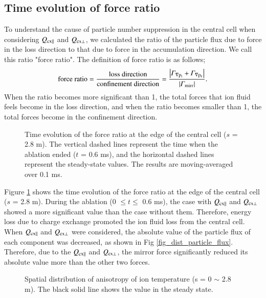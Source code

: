 \documentclass{jasse}%
\begin{document}
\subsection{Time evolution of force ratio}
To understand the cause of particle number suppression in the central cell when considering $Q_{\rm{cx\parallel}}$ and $Q_{\rm{cx\bot}}$, we calculated the ratio of the particle flux due to force in the loss direction to that due to force in the accumulation direction. We call this ratio "force ratio". The definition of force ratio is as follows; 
\begin{equation}
    \rm{force~ratio} = \frac{\rm{loss~direction}}{\rm{confinement~direction}}  = \frac{\left\lvert \varGamma _{\rm{\nabla p_{i}}} + \varGamma _{\rm{\nabla p_{e}}}\right\rvert}{\left\lvert \varGamma _{\rm{mirr}}\right\rvert}.
\end{equation}
When the ratio becomes more significant than 1, the total forces that ion fluid feels become in the loss direction, and when the ratio becomes smaller than 1, the total forces become in the confinement direction.

\begin{figure}[t]
    \centering
    
    \caption{Time evolution of the force ratio at the edge of the central cell ($s$ = 2.8 m). The vertical dashed lines represent the time when the ablation ended ($t$ = 0.6 ms), and the horizontal dashed lines represent the steady-state values. The results are moving-averaged over 0.1 ms.} \label{fig_time_evol_force_ratio}
\end{figure}

Figure \ref{fig_time_evol_force_ratio} shows the time evolution of the force ratio at the edge of the central cell ($s$ = 2.8 m). During the ablation (0 $\leq t \leq$ 0.6 ms), the case with $Q_{\rm{cx}\parallel}$ and $Q_{\rm{cx}\bot}$ showed a more significant value than the case without them. Therefore, energy loss due to charge exchange promoted the ion fluid loss from the central cell. When $Q_{\rm{cx}\parallel}$ and $Q_{\rm{cx}\bot}$ were considered, the absolute value of the particle flux of each component was decreased, as shown in Fig \ref{fig_dist_particle_flux}. Therefore, due to the $Q_{\rm{cx}\parallel}$ and $Q_{\rm{cx}\bot}$, the mirror force significantly reduced its absolute value more than the other two forces. 

\begin{figure}
    \centering
    
    \caption{Spatial distribution of anisotropy of ion temperature (s = 0 $\sim$ 2.8 m). The black solid line shows the value in the steady state.} \label{fig_dist_anisotropy}
\end{figure}
\end{document}
